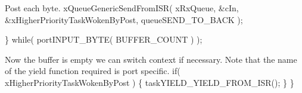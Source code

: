 \begin{DoxyPre}Post each byte.
                xQueueGenericSendFromISR( xRxQueue, &cIn, &xHigherPriorityTaskWokenByPost, queueSEND\_TO\_BACK );\end{DoxyPre}



\begin{DoxyPre}        \} while( portINPUT\_BYTE( BUFFER\_COUNT ) );\end{DoxyPre}



\begin{DoxyPre}Now the buffer is empty we can switch context if necessary.  Note that the
name of the yield function required is port specific.
        if( xHigherPriorityTaskWokenByPost )
        \{
                taskYIELD\_YIELD\_FROM\_ISR();
        \}
 \}
 \end{DoxyPre}
 